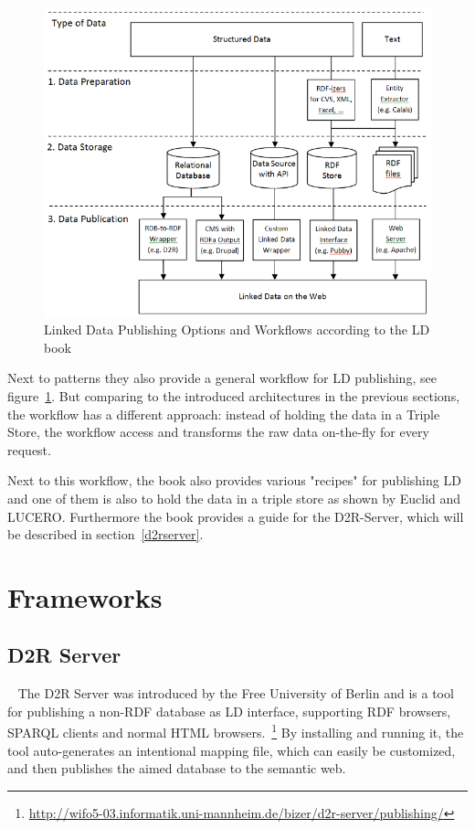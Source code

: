 \begin{figure}[ht]
	\centering
\includegraphics[width=\textwidth]{img/ld_architecture.png}
	\caption{Linked Data Publishing Options and Workflows according to the LD book}
	\label{ld_architecture}
\end{figure}

Next to patterns they also provide a general workflow for LD publishing, see figure~\ref{ld_architecture}. But comparing to the introduced architectures in the previous sections, the workflow has a different approach: instead of holding the data in a Triple Store, the workflow access and transforms the raw data on-the-fly for every request.

Next to this workflow, the book also provides various "recipes" for publishing LD and one of them is also to hold the data in a triple store as shown by Euclid and LUCERO. Furthermore the book provides a guide for the D2R-Server, which will be described in section~\ref{d2rserver}.

\section{Frameworks}

\subsection{D2R Server}~\label{d2rserver}
The D2R Server was introduced by the Free University of Berlin and is a tool for publishing a non-RDF database as LD interface, supporting RDF browsers, SPARQL clients and normal HTML browsers.~\footnote{\url{http://wifo5-03.informatik.uni-mannheim.de/bizer/d2r-server/publishing/}} By installing and running it, the tool auto-generates an intentional mapping file, which can easily be customized, and then publishes the aimed database to the semantic web.

